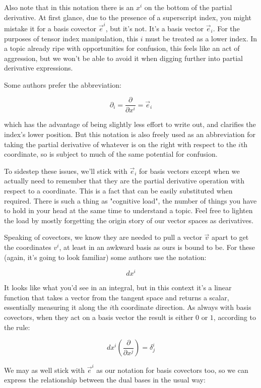 Also note that in this notation there is an $x^i$ on the bottom of the partial derivative. At first glance, due to the presence of a superscript index, you might mistake it for a basis covector $\vec{e}^i$, but it's not. It's a basis vector $\vec{e}_i$. For the purposes of tensor index manipulation, this $i$ must be treated as a lower index. In a topic already ripe with opportunities for confusion, this feels like an act of aggression, but we won't be able to avoid it when digging further into partial derivative expressions.

Some authors prefer the abbreviation:

$$
\partial_i = \frac{\partial}{\partial x^i} = \vec{e}_i
$$

which has the advantage of being slightly less effort to write out, and clarifies the index's lower position. But this notation is also freely used as an abbreviation for taking the partial derivative of whatever is on the right with respect to the $i$th coordinate, so is subject to much of the same potential for confusion.

To sidestep these issues, we'll stick with $\vec{e}_i$ for basis vectors except when we actually need to remember that they are the partial derivative operation with respect to a coordinate. This is a fact that can be easily substituted when required. There is such a thing as "cognitive load", the number of things you have to hold in your head at the same time to understand a topic. Feel free to lighten the load by mostly forgetting the origin story of our vector spaces as derivatives.

Speaking of covectors, we know they are needed to pull a vector $\vec{v}$ apart to get the coordinates $v^i$, at least in an awkward basis as ours is bound to be. For these (again, it's going to look familiar) some authors use the notation:

$$
dx^i
$$

It looks like what you'd see in an integral, but in this context it's a linear function that takes a vector from the tangent space and returns a scalar, essentially measuring it along the $i$th coordinate direction. As always with basis covectors, when they act on a basis vector the result is either $0$ or $1$, according to the rule:

$$
dx^i \left( \frac{\partial}{\partial x^j} \right)
=
\delta^i_j
$$

We may as well stick with $\vec{e}^{i}$ as our notation for basis covectors too, so we can express the relationship between the dual bases in the usual way:

